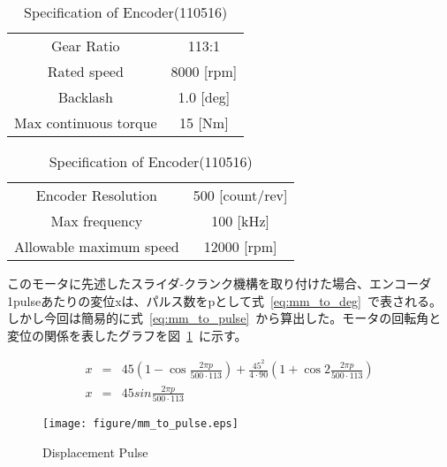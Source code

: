 \documentclass[a4paper,12pt]{article_vdlab_sotsuron}
\begin{document}
\vspace*{10mm}
\begin{table}[htp]
  \begin{minipage}{0.5\textwidth}
    \begin{center}
      \makeatletter
	\def\@captype{table}   
	\makeatother
	\caption{Specification Gearhead(203126)}
	\label{tab:113:1}
	  \begin{tabular}{cc}\hline
	    Gear Ratio & 113:1 \\
	    Rated speed & 8000 [rpm] \\
	    Backlash & 1.0 [deg] \\
	    Max continuous torque & 15 [Nm] \\\hline
	  \end{tabular}  
    \end{center}
  \end{minipage}
  \begin{minipage}{0.5\textwidth}
      \begin{center}
	\makeatletter
	\def\@captype{table}   
	\makeatother
	\caption{Specification of Encoder(110516)}
	\label{tab:500pulse}
	  \begin{tabular}{cc}\hline
	    Encoder Resolution & 500 [count/rev] \\
	    Max frequency & 100 [kHz] \\ 
	    Allowable maximum speed & 12000 [rpm] \\\hline
	  \end{tabular}  
	\end{center}
  \end{minipage}
\end{table}

\vspace*{10mm}
このモータに先述したスライダ-クランク機構を取り付けた場合、エンコーダ1pulseあたりの変位xは、パルス数をpとして式~\ref{eq:mm_to_deg}~で表される。しかし今回は簡易的に式~\ref{eq:mm_to_pulse}~から算出した。モータの回転角と変位の関係を表したグラフを図~\ref{fig:mm_to_pulse}~に示す。

\begin{eqnarray}
 \label{eq:mm_to_deg} x &=& 45(1-\cos \frac{2\pi p}{500\cdot 113})+\frac{45^2}{4\cdot 90} (1+\cos 2 \frac{2\pi p}{500\cdot 113}) \\
 \label{eq:mm_to_pulse} x &=& 45sin\frac{2\pi p}{500\cdot 113}
\end{eqnarray}

\newpage
\begin{figure}[htp]
  \hspace*{45mm}
    \texttt{[image: figure/mm\_to\_pulse.eps]}
    \vspace*{3mm}
    \caption{Displacement Pulse}
    \label{fig:mm_to_pulse}
\end{figure}
\end{document}
